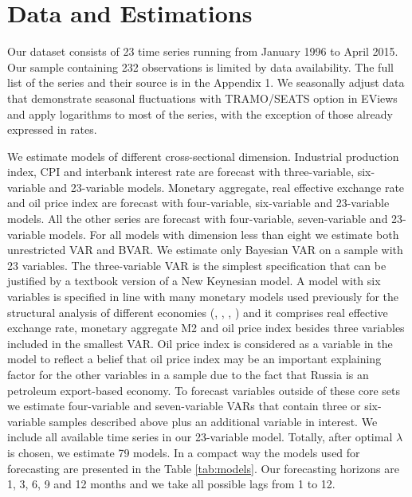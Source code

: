 \documentclass[11pt]{article} %
\begin{document}
\section{Data and Estimations}

Our dataset consists  of 23 time series running from January 1996 to April 2015. Our sample containing 232 observations is limited by data availability. The full list of the series and their source is in the Appendix 1. We seasonally adjust data that demonstrate seasonal fluctuations with TRAMO/SEATS option in EViews and apply logarithms to most of the series, with the exception of those already expressed in rates. 

We estimate models of different cross-sectional dimension. Industrial production index, CPI and interbank interest rate are forecast with three-variable, six-variable and 23-variable models.  Monetary aggregate, real effective exchange rate and oil price index are forecast with four-variable, six-variable and 23-variable models. All the other series are forecast  with four-variable, seven-variable and 23-variable models. For all models with dimension less than eight we estimate both unrestricted VAR and BVAR. We estimate only Bayesian VAR on a sample with 23 variables.
The three-variable VAR is the simplest specification that can be justified by a textbook version of a New Keynesian model.  
A model with six variables is specified in line with many monetary models used previously for the structural analysis of different economies (\cite{sims_1992}, \cite{kim_roubini_2000}, \cite{bjornland_2008}, \cite{scholl_uhlig_2008}) and it comprises real effective exchange rate, monetary aggregate M2 and oil price index besides three variables included in the smallest VAR. Oil price index is considered as a variable in the model to reflect a belief that oil price index may be an important explaining factor for the other variables in a sample due to the fact that Russia is an petroleum export-based economy. To forecast variables outside of these core sets we estimate four-variable and seven-variable VARs that contain three or six-variable samples described above plus an additional variable in interest. We include all available time series in our 23-variable model. Totally, after optimal $\lambda$ is chosen, we estimate 79 models. In a compact way the models used for forecasting are presented in the Table \ref{tab:models}. 
Our forecasting horizons are 1, 3, 6, 9 and 12 months and we take all possible lags from 1 to 12. 
\end{document}
